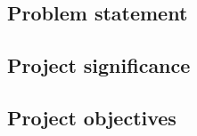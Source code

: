 \documentclass[../main.tex]{subfiles}
\begin{document}
\subsection{Problem statement}




\blindtext

\subsection{Project significance}








\blindtext

\subsection{Project objectives}




\blindtext
\end{document}
